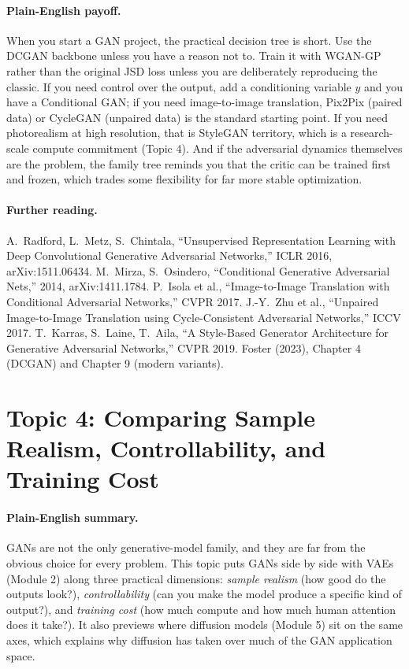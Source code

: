 \documentclass[11pt]{article}
\theoremstyle{remark}
\begin{document}
\paragraph{Plain-English payoff.}
When you start a GAN project, the practical decision tree is short. Use the DCGAN backbone unless you have a reason not to. Train it with WGAN-GP rather than the original JSD loss unless you are deliberately reproducing the classic. If you need control over the output, add a conditioning variable $y$ and you have a Conditional GAN; if you need image-to-image translation, Pix2Pix (paired data) or CycleGAN (unpaired data) is the standard starting point. If you need photorealism at high resolution, that is StyleGAN territory, which is a research-scale compute commitment (Topic 4). And if the adversarial dynamics themselves are the problem, the family tree reminds you that the critic can be trained first and frozen, which trades some flexibility for far more stable optimization.

\paragraph{Further reading.}\begingroup\sloppy
A.\ Radford, L.\ Metz, S.\ Chintala, ``Unsupervised Representation Learning with Deep Convolutional Generative Adversarial Networks,'' ICLR 2016, arXiv:1511.06434. M.\ Mirza, S.\ Osindero, ``Conditional Generative Adversarial Nets,'' 2014, arXiv:1411.1784. P.\ Isola et al., ``Image-to-Image Translation with Conditional Adversarial Networks,'' CVPR 2017. J.-Y.\ Zhu et al., ``Unpaired Image-to-Image Translation using Cycle-Consistent Adversarial Networks,'' ICCV 2017. T.\ Karras, S.\ Laine, T.\ Aila, ``A Style-Based Generator Architecture for Generative Adversarial Networks,'' CVPR 2019. Foster (2023), Chapter 4 (DCGAN) and Chapter 9 (modern variants).
\endgroup

\section{Topic 4: Comparing Sample Realism, Controllability, and Training Cost}

\paragraph{Plain-English summary.}
GANs are not the only generative-model family, and they are far from the obvious choice for every problem. This topic puts GANs side by side with VAEs (Module 2) along three practical dimensions: \emph{sample realism} (how good do the outputs look?), \emph{controllability} (can you make the model produce a specific kind of output?), and \emph{training cost} (how much compute and how much human attention does it take?). It also previews where diffusion models (Module 5) sit on the same axes, which explains why diffusion has taken over much of the GAN application space.
\end{document}
